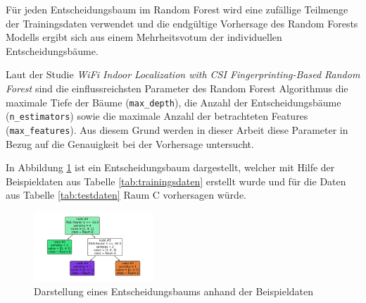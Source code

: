 Für jeden Entscheidungsbaum im Random Forest wird eine zufällige Teilmenge der Trainingsdaten verwendet und die endgültige Vorhersage des Random Forests Modells ergibt sich aus einem Mehrheitsvotum der individuellen Entscheidungsbäume.

Laut der Studie \textit{WiFi Indoor Localization with CSI Fingerprinting-Based Random Forest} sind die einflussreichsten Parameter des Random Forest Algorithmus die maximale Tiefe der Bäume (\texttt{max\_depth}), die Anzahl der Entscheidungsbäume (\texttt{n\_estimators}) sowie die maximale Anzahl der betrachteten Features (\texttt{max\_features}). Aus diesem Grund werden in dieser Arbeit diese Parameter in Bezug auf die Genauigkeit bei der Vorhersage untersucht.

In Abbildung \ref{fig:random_forest} ist ein Entscheidungsbaum dargestellt, welcher mit Hilfe der Beispieldaten aus Tabelle \ref{tab:trainingsdaten} erstellt wurde und für die Daten aus Tabelle \ref{tab:testdaten} Raum C vorhersagen würde.

\begin{figure}[H]
    \centering
    \includegraphics[width=0.4\textwidth]{images/random_forest.png}
    \caption{Darstellung eines Entscheidungsbaums anhand der Beispieldaten}
    \label{fig:random_forest}
\end{figure}


